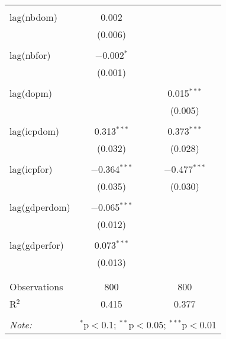 \begin{tabular}{@{\extracolsep{5pt}}lcc}
  & & \\ 
 lag(nbdom) & 0.002 &  \\ 
  & (0.006) &  \\ 
  & & \\ 
 lag(nbfor) & $-$0.002$^{*}$ &  \\ 
  & (0.001) &  \\ 
  & & \\ 
 lag(dopm) &  & 0.015$^{***}$ \\ 
  &  & (0.005) \\ 
  & & \\ 
 lag(icpdom) & 0.313$^{***}$ & 0.373$^{***}$ \\ 
  & (0.032) & (0.028) \\ 
  & & \\ 
 lag(icpfor) & $-$0.364$^{***}$ & $-$0.477$^{***}$ \\ 
  & (0.035) & (0.030) \\ 
  & & \\ 
 lag(gdperdom) & $-$0.065$^{***}$ &  \\ 
  & (0.012) &  \\ 
  & & \\ 
 lag(gdperfor) & 0.073$^{***}$ &  \\ 
  & (0.013) &  \\ 
  & & \\ 
\hline \\[-1.8ex] 
Observations & 800 & 800 \\ 
R$^{2}$ & 0.415 & 0.377 \\ 
\hline 
\hline \\[-1.8ex] 
\textit{Note:}  & \multicolumn{2}{r}{$^{*}$p$<$0.1; $^{**}$p$<$0.05; $^{***}$p$<$0.01} \\ 
\end{tabular} 

